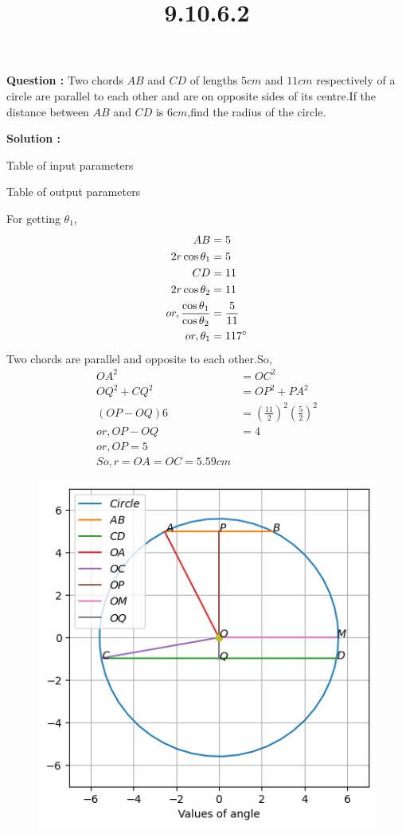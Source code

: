 \documentclass[12pt]{article}
\providecommand{\brak}[1]{\ensuremath{\left(#1\right)}}
\begin{document}
\title{\textbf{9.10.6.2}}
\date{}
\maketitle
\textbf{Question :} Two chords $AB$ and $CD$ of lengths $5 cm$ and $11 cm$ respectively of a circle are parallel to each other and are on opposite sides of its centre.If the distance between $AB$ and $CD$ is $6 cm$,find the radius of the circle.

\textbf{Solution :}
\begin{table}[H]
    \centering
    
    \caption{Table of input parameters}
    \label{tab:9.10.6.2.1}
\end{table}
\begin{table}[H]
    \centering
   
    \caption{Table of output parameters}
    \label{tab:9.10.6.2.2}
\end{table}
For getting $\theta_1$,
\begin{align}
    AB&=5\\
    2r\cos{\theta_1}&=5\\
    CD&=11\\
    2r\cos{\theta_2}&=11\\
    or,\frac{\cos{\theta_1}}{\cos{\theta_2}}&=\frac{5}{11}\\
    or,\theta_1&=117\degree
    \end{align}
Two chords are parallel and opposite to each other.So,
\begin{align}
   OA^2&=OC^2\\
   OQ^2+CQ^2&=OP^2+PA^2\\
   \brak{OP-OQ}6&=\brak{\frac{11}{2}}^2\brak{\frac{5}{2}}^2\\
   or,OP-OQ&=4\\
   or,OP=5\\
   So,r=OA=OC=5.59cm
    \end{align}
    \begin{figure}[H]                            
\centering
\includegraphics[width=\columnwidth]{fig/9.10.6.2.png}             
\caption{}                              
\label{fig:9.10.6.2}
\end{figure}
\end{document}
